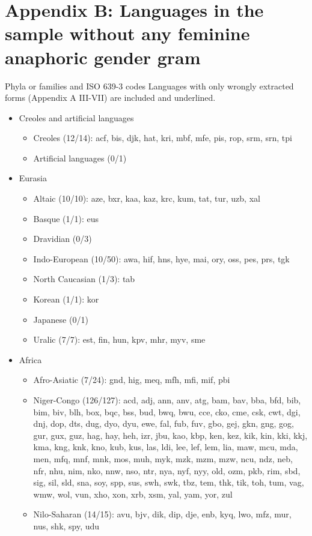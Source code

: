 
\section*{Appendix B: Languages in the sample without any feminine anaphoric gender gram \normalfont [629 languages]}

\noindent Phyla or families and ISO 639-3 codes
\noindent Languages with only wrongly extracted forms (Appendix A III-VII) are included and underlined.

\begin{itemize}[label={},leftmargin=0cm,labelindent=5pt,itemindent=0pt]
  \item Creoles and artificial languages
    \begin{itemize}[label={},leftmargin=!,labelindent=5pt,itemindent=-15pt]
  	\item Creoles (12/14): acf, bis, djk, hat, kri, mbf, mfe, pis, rop, srm, srn, tpi
  	\item Artificial languages (0/1)
  \end{itemize}

  \item Eurasia
    \begin{itemize}[label={},leftmargin=!,labelindent=5pt,itemindent=-15pt]
  	\item Altaic (10/10): aze, bxr, kaa, kaz, krc, kum, tat, tur, uzb, xal
  	\item Basque (1/1): eus
  	\item Dravidian (0/3)
  	\item Indo-European (10/50): awa, hif, hns, hye, mai, ory, oss, pes, prs, tgk
  	\item North Caucasian (1/3): tab
  	\item Korean (1/1): kor
  	\item Japanese (0/1)
  	\item Uralic (7/7): est, fin, hun, kpv, mhr, myv, sme
  \end{itemize}

  \item Africa
    \begin{itemize}[label={},leftmargin=!,labelindent=5pt,itemindent=-15pt]
  	\item Afro-Asiatic (7/24): gnd, hig, meq, mfh, mfi, mif, pbi
  	\item Niger-Congo (126/127): acd, adj, ann, anv, atg, bam, bav, bba, bfd, bib, bim, biv, blh, box, bqc, bss, bud, bwq, bwu, cce, cko, cme, csk, cwt, dgi, dnj, dop, dts, dug, dyo, dyu, ewe, fal, fub, fuv, gbo, gej, gkn, gng, gog, gur, gux, guz, hag, hay, heh, izr, jbu, kao, kbp, ken, kez, kik, kin, kki, kkj, kma, kng, knk, kno, kub, kus, las, ldi, lee, lef, lem, lia, maw, mcu, mda, men, mfq, mnf, mnk, mos, muh, myk, mzk, mzm, mzw, ncu, ndz, neb, nfr, nhu, nim, nko, nnw, nso, ntr, nya, nyf, nyy, old, ozm, pkb, rim, sbd, sig, sil, sld, sna, soy, spp, sus, swh, swk, tbz, tem, thk, tik, toh, tum, vag, wmw, wol, vun, xho, xon, xrb, xsm, yal, yam, yor, zul
  	\item Nilo-Saharan (14/15): avu, bjv, dik, dip, dje, enb, kyq, lwo, mfz, mur, nus, shk, spy, udu
    \end{itemize}


\end{itemize}
